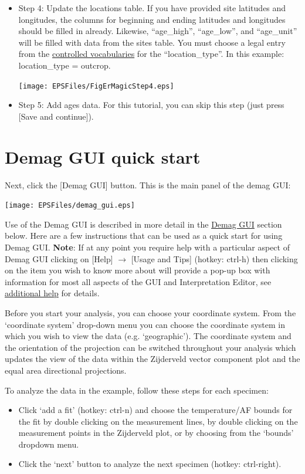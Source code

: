 \documentclass[11pt]{book}
\begin{document}
{{\begin{itemize}
\texttt{[image: EPSFiles/FigErMagicStep3.eps]}


\item Step 4: Update the locations table.  If you have provided site latitudes and longitudes, the columns for beginning and ending latitudes and longitudes should be filled in already. Likewise, ``age_high'', ``age_low'', and ``age_unit'' will be filled with data from the sites table.  You must choose a legal entry from the \href{http://earthref.org/MAGIC/shortlists.htm}{controlled vocabularies} for the  ``location\_type''. In this example: location\_type = outcrop.

\texttt{[image: EPSFiles/FigErMagicStep4.eps]}

\item Step 5: Add ages data.  For this tutorial, you can skip this step (just press [Save and continue]).

\end{itemize}


\section{Demag GUI quick start}
\label{sect:demag_gui}

Next, click the [Demag GUI] button.  This is the main panel of the demag GUI:

\texttt{[image: EPSFiles/demag\_gui.eps]}

Use of the Demag GUI is described in more detail in the \href{#demag_gui.py}{Demag GUI} section below. Here are a few instructions that can be used as a quick start for using Demag GUI. {\bf Note}: If at any point you require help with a particular aspect of Demag GUI clicking on [Help] $\rightarrow$ [Usage and Tips] (hotkey: ctrl-h) then clicking on the item you wish to know more about will provide a pop-up box with information for most all aspects of the GUI and Interpretation Editor, see \hyperref[add-help]{additional help} for details.

Before you start your analysis, you can choose your coordinate system.  From the `coordinate system' drop-down menu you can choose the coordinate system in which you wish to view the data (e.g.  `geographic'). The coordinate system and the orientation of the projection can be switched throughout your analysis which updates the view of the data within the Zijderveld vector component plot and the equal area directional projections.

To analyze the data in the example, follow these steps for each specimen:
\begin{itemize}
\item Click `add a fit' (hotkey: ctrl-n) and choose the temperature/AF bounds for the fit by double clicking on the measurement lines, by double clicking on the measurement points in the Zijderveld plot, or by choosing from the `bounds' dropdown menu.
\item Click the `next' button to analyze the next specimen (hotkey: ctrl-right).
\end{itemize}

}}
\end{document}
